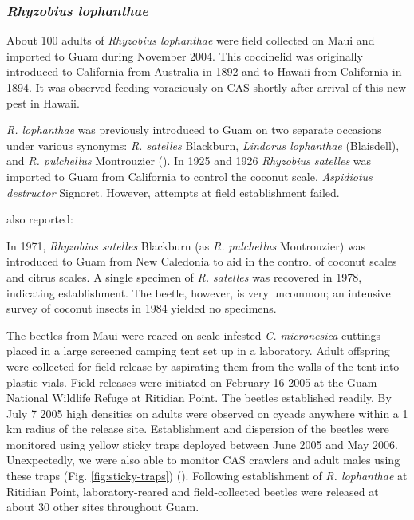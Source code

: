\documentclass[12pt,letterpaper,english,bibliography=totocnumbered, abstract=on]{scrartcl}
\begin{document}
\subsubsection{\textit{Rhyzobius lophanthae}}

About 100 adults of \textit{Rhyzobius lophanthae} were field collected on Maui and imported to Guam during November 2004. This coccinelid was originally 
introduced to California from Australia in 1892 and to Hawaii from California in 1894. It was observed feeding voraciously on CAS shortly after arrival of this new pest in Hawaii. 

\textit{R. lophanthae} was previously introduced to Guam on two separate occasions under various synonyms: \textit{R. satelles} Blackburn, \textit{Lindorus lophanthae} (Blaisdell), and \textit{R. pulchellus} Montrouzier (\cite{nafus_biological_1989}).
In 1925 and 1926 \textit{Rhyzobius satelles} was imported to Guam from California to control the coconut scale, \textit{Aspidiotus destructor} Signoret. However, attempts at field establishment failed.  

\cite{nafus_biological_1989} also reported:
\begin{displayquote}
 In 1971, \textit{Rhyzobius satelles} Blackburn (as \textit{R. pulchellus} Montrouzier) was introduced to Guam from New Caledonia to aid in the control of coconut scales and citrus scales. A single specimen of \textit{R. satelles} was recovered in 1978, indicating establishment. The beetle, however, is very uncommon; an intensive survey of coconut insects in 1984 yielded no specimens.
\end{displayquote}

The beetles from Maui were reared on scale-infested \textit{C. micronesica} cuttings placed in a large screened camping tent set up in a laboratory. Adult offspring were collected for field release by aspirating them from the walls of the tent into plastic vials. Field releases were initiated on February 16 2005 at the Guam National Wildlife Refuge at Ritidian Point. The beetles established readily. By July 7 2005 high densities on adults were observed on cycads anywhere within a 1 km radius of the release site.  Establishment and dispersion of the beetles were monitored using yellow sticky traps deployed between June 2005 and May 2006. Unexpectedly, we were also able to monitor CAS crawlers and adult males using these traps (Fig. \ref{fig:sticky-traps})  (\cite{moore_biological_2017-2}). Following establishment of \textit{R. lophanthae} at Ritidian Point, laboratory-reared and field-collected beetles were released at about 30 other sites throughout Guam. 
\end{document}
